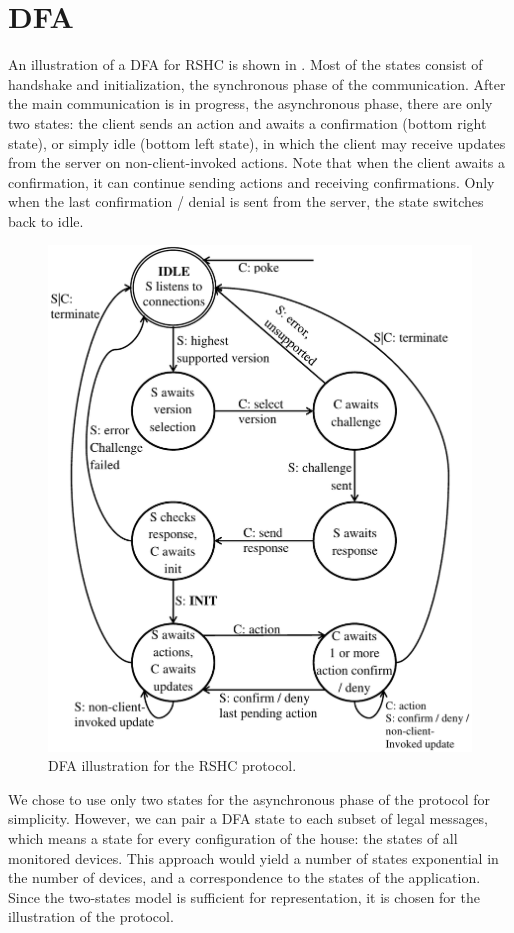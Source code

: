 \section{DFA}
\label{sec:dfa}

An illustration of a DFA for RSHC is shown in . Most of the states consist of handshake and initialization, the synchronous phase of the communication. After the main communication is in progress, the asynchronous phase, there are only two states: the client sends an action and awaits a confirmation (bottom right state), or simply idle (bottom left state), in which the client may receive updates from the server on non-client-invoked actions. Note that when the client awaits a confirmation, it can continue sending actions and receiving confirmations. Only when the last confirmation / denial is sent from the server, the state switches back to idle.

\begin{figure}[h]
  \centering
  \includegraphics[width=4.95in]{figures/dfa.pdf}
  \caption{DFA illustration for the RSHC protocol.}
  \label{fig:dfa:dfa}
\end{figure}

We chose to use only two states for the asynchronous phase of the protocol for simplicity. However, we can pair a DFA state to each subset of legal messages, which means a state for every configuration of the house: the states of all monitored devices. This approach would yield a number of states exponential in the number of devices, and a correspondence to the states of the application. Since the two-states model is sufficient for representation, it is chosen for the illustration of the protocol.

